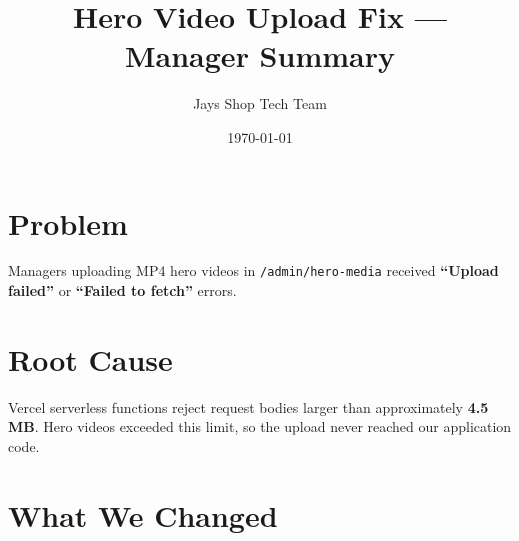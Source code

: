 \documentclass[11pt]{article}
\title{\textcolor{jaysnavy}{Hero Video Upload Fix — Manager Summary}}
\author{Jays Shop Tech Team}
\date{\today}
\begin{document}
\maketitle

\section*{Problem}
Managers uploading MP4 hero videos in \texttt{/admin/hero-media} received \textbf{``Upload failed''} or \textbf{``Failed to fetch''} errors.

\section*{Root Cause}
Vercel serverless functions reject request bodies larger than approximately \textbf{4.5 MB}. Hero videos exceeded this limit, so the upload never reached our application code.

\section*{What We Changed}
\end{document}
